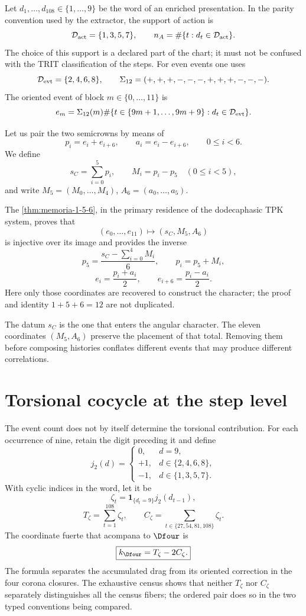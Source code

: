Let \(d_1,\ldots,d_{108}\in\{1,\ldots,9\}\) be the word of an enriched
presentation. In the parity convention used by the extractor, the support of
action is
\[
 \mathcal D_{\rm act}=\{1,3,5,7\},
 \qquad
 n_A=\#\{t:d_t\in\mathcal D_{\rm act}\}.
\]
The choice of this support is a declared part of the chart; it must not
be confused with the TRIT classification of the steps. For even events one
uses
\[
 \mathcal D_{\rm evt}=\{2,4,6,8\},
 \qquad
 \Sigma_{12}=(+,+,+,-,-,-,+,+,+,-,-,-).
\]
The oriented event of block \(m\in\{0,\ldots,11\}\) is
\[
 e_m=\Sigma_{12}(m)
 \#\{t\in\{9m+1,\ldots,9m+9\}:d_t\in\mathcal D_{\rm evt}\}.
\]

Let us pair the two semicrowns by means of
\[
 p_i=e_i+e_{i+6},
 \qquad
 a_i=e_i-e_{i+6},
 \qquad 0\leq i<6.
\]
We define
\[
 s_C=\sum_{i=0}^{5}p_i,
 \qquad
 M_i=p_i-p_5\quad(0\leq i<5),
\]
and write \(M_5=(M_0,\ldots,M_4)\),
\(A_6=(a_0,\ldots,a_5)\).

The \cref{thm:memoria-1-5-6}, in the primary residence of the
dodecaphasic TPK system, proves that
\[
 (e_0,\ldots,e_{11})\longmapsto(s_C,M_5,A_6)
\]
is injective over its image and provides the inverse
\[
 p_5=\frac{s_C-\sum_{i=0}^{4}M_i}{6},\qquad
 p_i=p_5+M_i,
\]
\[
 e_i=\frac{p_i+a_i}{2},\qquad
 e_{i+6}=\frac{p_i-a_i}{2}.
\]
Here only those coordinates are recovered to construct the character; the
proof and identity \(1+5+6=12\) are not duplicated.

The datum \(s_C\) is the one that enters the angular character. The eleven coordinates
\((M_5,A_6)\) preserve the placement of that total. Removing them before
composing histories conflates different events that may produce
different correlations.

\section{Torsional cocycle at the step level}

The event count does not by itself determine the torsional contribution. For
each occurrence of nine, retain the digit preceding it and define
\[
 j_2(d)=
 \begin{cases}
 0,&d=9,\\
 +1,&d\in\{2,4,6,8\},\\
 -1,&d\in\{1,3,5,7\}.
 \end{cases}
\]
With cyclic indices in the word, let it be
\[
 \zeta_t=\mathbf 1_{\{d_t=9\}}j_2(d_{t-1}),
\]
\[
 T_\zeta=\sum_{t=1}^{108}\zeta_t,
 \qquad
 C_\zeta=\sum_{t\in\{27,54,81,108\}}\zeta_t.
\]
The coordinate fuerte that acompana to \(\Dfour\) is
\[
 \boxed{k_{\Dfour}=T_\zeta-2C_\zeta.}
\]
The formula separates the accumulated drag from its oriented correction in the
four corona closures. The exhaustive census shows that neither
\(T_\zeta\) nor \(C_\zeta\) separately distinguishes all the census fibers;
the ordered pair does so in the two typed conventions being compared.

